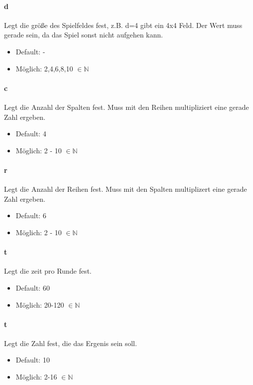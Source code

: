 \documentclass[]{article}
\begin{document}
\begin{multicols}{2}

	\paragraph{d}  Legt die größe des Spielfeldes fest, z.B. d=4 gibt ein 4x4 Feld. Der Wert muss gerade sein, da das Spiel sonst nicht aufgehen kann.
	\begin{itemize}
		\item Default: -
		\item Möglich: 2,4,6,8,10 $\in \mathbb{N}$
	\end{itemize}

	\paragraph{c} Legt die Anzahl der Spalten fest. Muss mit den Reihen multipliziert eine gerade Zahl ergeben.
	\begin{itemize}
		\item Default: 4
		\item Möglich: 2 - 10 $\in \mathbb{N}$
	\end{itemize}

	\paragraph{r} Legt die Anzahl der Reihen fest. Muss mit den Spalten multiplizert eine gerade Zahl ergeben.
	\begin{itemize}
		\item Default: 6
		\item Möglich: 2 - 10 $\in \mathbb{N}$
	\end{itemize}

	\paragraph{t} Legt die zeit pro Runde fest.
	\begin{itemize}
		\item Default: 60
		\item Möglich: 20-120 $\in \mathbb{N}$
	\end{itemize}

	\paragraph{t} Legt die Zahl fest, die das Ergenis sein soll.
	\begin{itemize}
		\item Default: 10
		\item Möglich: 2-16 $\in \mathbb{N}$
	\end{itemize}
\end{multicols}
\end{document}
